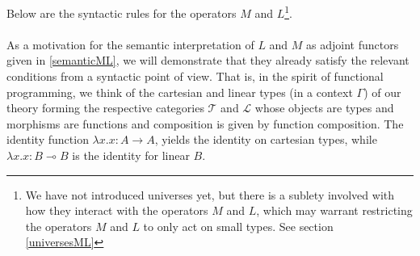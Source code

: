 Below are the syntactic rules for the operators $M$ and $L$\footnote{We have not introduced universes yet, but there is a sublety involved with how they interact with the operators $M$ and $L$, which may warrant restricting the operators $M$ and $L$ to only act on small types. See section \ref{universesML}}. \\
\\
As a motivation for the semantic interpretation of $L$ and $M$ as adjoint functors given in \ref{semanticML}, we will demonstrate that they already satisfy the relevant conditions from a syntactic point of view. That is, in the spirit of functional programming, we think of the cartesian and linear types (in a context $\Gamma$) of our theory forming the respective categories $\mathcal{T}$ and $\mathcal{L}$ whose objects are types and morphisms are functions and composition is given by function composition. The identity function $\lambda x. x : A \to A$, yields the identity on cartesian types, while $\lambda x.x : B \multimap B$ is the identity for linear $B$.
